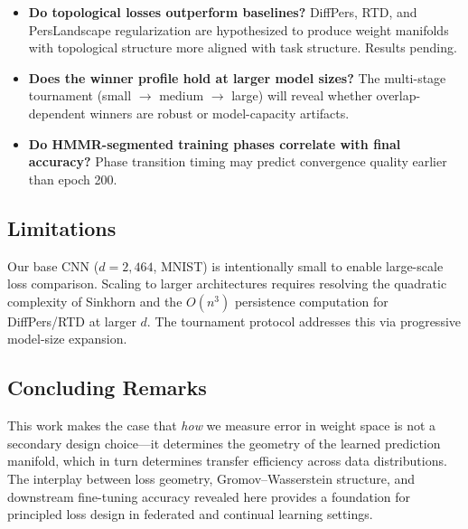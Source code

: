 \begin{itemize}
    \item \textbf{Do topological losses outperform baselines?} DiffPers, RTD, and PersLandscape regularization are hypothesized to produce weight manifolds with topological structure more aligned with task structure. Results pending.
    \item \textbf{Does the winner profile hold at larger model sizes?} The multi-stage tournament (small $\to$ medium $\to$ large) will reveal whether overlap-dependent winners are robust or model-capacity artifacts.
    \item \textbf{Do HMMR-segmented training phases correlate with final accuracy?} Phase transition timing may predict convergence quality earlier than epoch 200.
\end{itemize}

\subsection{Limitations}

Our base CNN ($d=2{,}464$, MNIST) is intentionally small to enable large-scale loss comparison. Scaling to larger architectures requires resolving the quadratic complexity of Sinkhorn and the $O(n^3)$ persistence computation for DiffPers/RTD at larger $d$. The tournament protocol addresses this via progressive model-size expansion.

\subsection{Concluding Remarks}

This work makes the case that \emph{how} we measure error in weight space is not a secondary design choice---it determines the geometry of the learned prediction manifold, which in turn determines transfer efficiency across data distributions. The interplay between loss geometry, Gromov--Wasserstein structure, and downstream fine-tuning accuracy revealed here provides a foundation for principled loss design in federated and continual learning settings.

